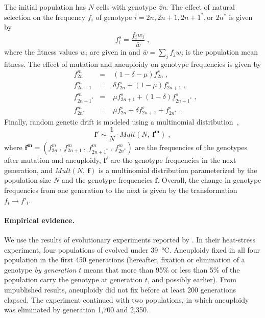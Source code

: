 \documentclass[12pt]{extarticle}
\let\vec\mathbf
\newcommand{\euwt}{\emph{2n}}
\begin{document}
The initial population has $N$ cells with genotype \euwt.
The effect of natural selection on the frequency $f_i$ of genotype $i = 2n, 2n+1, 2n+1^*, \text{or } 2n^*$ is given by
    \begin{equation} \label{eq:selection-single} 
      f^s_i = \frac{f_i w_i}{\bar{w}} \;,
    \end{equation}
where the fitness values $w_i$ are given in  and $\bar{w} = \sum_{j}{f_j w_j}$ is the population mean fitness.
The effect of mutation and aneuploidy on genotype frequencies is given by
    \begin{equation} \label{eq:mutation-aneuploidy-single}
    \begin{aligned}
      &f^m_{2n} &=&\; (1 - \delta - \mu) f^s_{2n}  \;,\\
      &f^m_{2n+1} &=&\; \delta f^s_{2n} + (1 - \mu) f^s_{2n+1}  \;,\\
      &f^m_{2n+1^*} &=&\; \mu f^s_{2n+1} + (1-\delta) f^s_{2n+1^*}  \;,\\
      &f^m_{2n^*} &=&\; \mu f^s_{2n} + \delta f^s_{2n+1} + f^s_{2n^*}  \;.
    \end{aligned}
    \end{equation}
Finally, random genetic drift is modeled using a multinomial distribution~\citep{Otto2007},
    \begin{equation} \label{eq:drift-single}
      \vec{f'} \sim \frac{1}{N} \cdot \mathit{Mult}(N,\ \vec{f^m}) \;,
    \end{equation}
where $\vec{f^m}=(f^m_{2n}\ ,\ f^m_{2n+1}\ ,\ f^m_{2n+1^*}\ ,\ f^m_{2n^*})$ are the frequencies of the genotypes after mutation and aneuploidy, $\vec{f'}$ are the genotype frequencies in the next generation, and $Mult(N,\ \vec{f})$ is a multinomial distribution parameterized by the population size $N$ and the genotype frequencies $\vec{f}$.
Overall, the change in genotype frequencies from one generation to the next is given by the transformation $f_i \to f'_i$.


\paragraph{Empirical evidence.}

We use the results of evolutionary experiments reported by \citet{Yona2012}.
In their heat-stress experiment, four populations of \yeast evolved under \SI{39}{\celsius}. Aneuploidy fixed in all four population in the first 450 generations (hereafter, fixation or elimination of a genotype \emph{by generation $t$} means that more than 95\% or less than 5\% of the population carry the genotype at generation $t$, and possibly earlier). From unpublished results, aneuploidy did not fix before at least 200 generations elapsed.
The experiment continued with two populations, in which aneuploidy was eliminated by generation 1,700 and 2,350.
\end{document}
